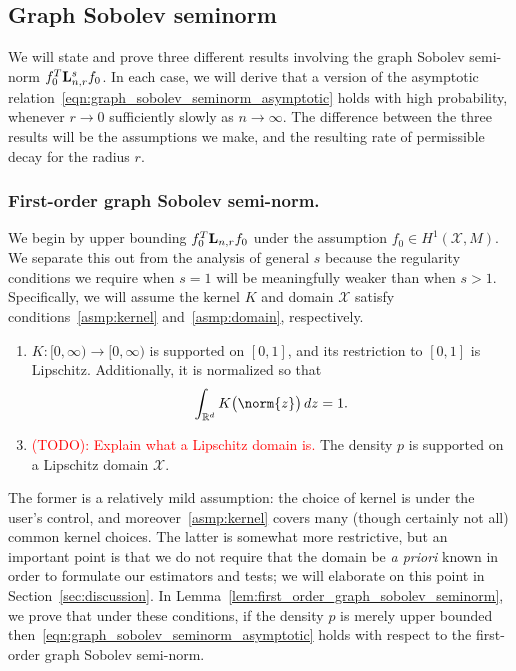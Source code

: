 \documentclass{article}
\newcommand{\Reals}{\mathbb{R}}
\newcommand{\1}{\mathbf{1}}
\newcommand{\Lap}{{\bf L}}
\newcommand{\Xset}{\mathcal{X}}
\theoremstyle{alden}
\theoremstyle{aldenthm}
\theoremstyle{definition}
\theoremstyle{remark}
\begin{document}
\subsection{Graph Sobolev seminorm}
\label{subsec:graph_sobolev_seminorm}
We will state and prove three different results involving the graph Sobolev semi-norm $f_0^T \Lap_{n,r}^s f_0$. In each case, we will derive that a version of the asymptotic relation~\eqref{eqn:graph_sobolev_seminorm_asymptotic} holds with high probability, whenever $r \to 0$ sufficiently slowly as $n \to \infty$. The difference between the three results will be the assumptions we make, and the resulting rate of permissible decay for the radius $r$. 

\subsubsection{First-order graph Sobolev semi-norm.}
\label{subsec:first_order_graph_sobolev_seminorm}
We begin by upper bounding $f_0^T \Lap_{n,r} f_0$ under the assumption $f_0 \in H^1(\Xset,M)$. We separate this out from the analysis of general $s$ because the regularity conditions we require when $s = 1$ will be meaningfully weaker than when $s > 1$. Specifically, we will assume the kernel $K$ and domain $\Xset$ satisfy conditions~\ref{asmp:kernel} and~\ref{asmp:domain}, respectively.
\begin{enumerate}[label=(K\arabic*)]
	\item
	\label{asmp:kernel}
	$K:[0,\infty) \to [0,\infty)$ is supported on $[0,1]$, and its restriction to $[0,1]$ is Lipschitz. Additionally, it is normalized so that
	\begin{equation*}
	\int_{\Reals^d} K\bigl(\norm{z}\bigr) \,dz = 1.
	\end{equation*}
\end{enumerate}
\begin{enumerate}[label=(P\arabic*)]
	\setcounter{enumi}{2}
	\item 
	\label{asmp:domain}
	\textcolor{red}{(TODO): Explain what a Lipschitz domain is.} The density $p$ is supported on a Lipschitz domain $\Xset$.
\end{enumerate}
The former is a relatively mild assumption: the choice of kernel is under the user's control, and moreover~\ref{asmp:kernel} covers many (though certainly not all) common kernel choices. The latter is somewhat more restrictive, but an important point is that we do not require that the domain be \textit{a priori} known in order to formulate our estimators and tests; we will elaborate on this point in Section~\ref{sec:discussion}. In Lemma~\ref{lem:first_order_graph_sobolev_seminorm}, we prove that under these conditions, if the density $p$ is merely upper bounded then~\eqref{eqn:graph_sobolev_seminorm_asymptotic} holds with respect to the first-order graph Sobolev semi-norm.
\end{document}

